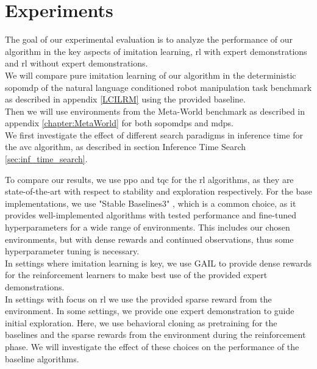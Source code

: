 
\chapter{Experiments}
\label{chapter:Experiments}
The goal of our experimental evaluation is to analyze the performance of our algorithm in the key aspects of 
imitation learning, \ac{rl} with expert demonstrations and \ac{rl} without expert demonstrations. \\

We will compare pure imitation learning of our algorithm in the deterministic \ac{sopomdp} of the 
natural language conditioned robot manipulation task benchmark as described in appendix \ref{LCILRM} using the provided baseline.\\

Then we will use environments from the Meta-World benchmark as described in appendix \ref{chapter:MetaWorld} for both \ac{sopomdp}s and \ac{mdp}s.\\

We first investigate the effect of different search paradigms in inference time for the \ac{avc} algorithm, as described in section Inference Time Search \ref{sec:inf_time_search}.

To compare our results, we use \ac{ppo} and \ac{tqc} for the \ac{rl} algorithms, as they are state-of-the-art with respect to stability and 
exploration respectively. For the base implementations, we use "Stable Baselines3" \cite{stable-baselines3}, which is a common choice, as it provides well-implemented algorithms with tested
performance and fine-tuned hyperparameters for a wide range of environments. This includes our chosen environments, but with dense rewards and continued observations,
thus some hyperparameter tuning is necessary.\\

In settings where imitation learning is key, we use GAIL to provide dense rewards for the reinforcement learners to make best use of the provided expert demonstrations. \\

In settings with focus on \ac{rl} we use the provided sparse reward from the environment. In some settings, we provide one 
expert demonstration to guide initial exploration. Here, we use behavioral cloning as pretraining for the baselines and the sparse rewards from the environment during the reinforcement phase. 
We will investigate the effect of these choices on the performance of the baseline algorithms.\\

